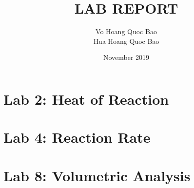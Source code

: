 \documentclass{presets}
\title{\textbf{LAB REPORT}}
\author{Vo Hoang Quoc Bao\\Hua Hoang Quoc Bao}
\date{November 2019}
\begin{document}
\maketitle


\newpage
\section{Lab 2: Heat of Reaction}



\newpage
\section{Lab 4: Reaction Rate}


\newpage
\section{Lab 8: Volumetric Analysis}

\end{document}
